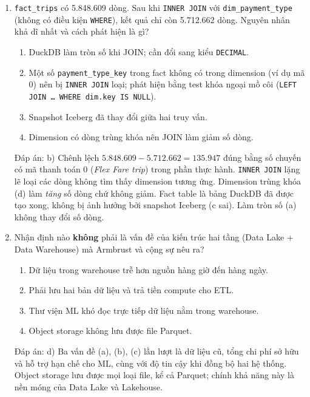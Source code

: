 \documentclass[12pt]{article}
\begin{document}
\begin{enumerate}[label=\textbf{\arabic*.}, leftmargin=1.6em, itemsep=1.2em]
\item \texttt{fact\_trips} có 5.848.609 dòng. Sau khi \texttt{INNER JOIN} với \texttt{dim\_payment\_type} (không có điều kiện \texttt{WHERE}), kết quả chỉ còn 5.712.662 dòng. Nguyên nhân khả dĩ nhất và cách phát hiện là gì?

\begin{enumerate}[label=\alph*), leftmargin=2.2em, itemsep=1pt]
    \item DuckDB làm tròn số khi JOIN; cần đổi sang kiểu \texttt{DECIMAL}.
    \item Một số \texttt{payment\_type\_key} trong fact không có trong dimension (ví dụ mã 0) nên bị \texttt{INNER JOIN} loại; phát hiện bằng test khóa ngoại mồ côi (\texttt{LEFT JOIN \dots{} WHERE dim.key IS NULL}).
    \item Snapshot Iceberg đã thay đổi giữa hai truy vấn.
    \item Dimension có dòng trùng khóa nên JOIN làm giảm số dòng.
\end{enumerate}
\begin{guidelinebox}{Đáp án: b)}
Chênh lệch $5.848.609 - 5.712.662 = 135.947$ đúng bằng số chuyến có mã thanh toán 0 (\textit{Flex Fare trip}) trong phần thực hành. \texttt{INNER JOIN} lặng lẽ loại các dòng không tìm thấy dimension tương ứng. Dimension trùng khóa (d) làm \emph{tăng} số dòng chứ không giảm. Fact table là bảng DuckDB đã được tạo xong, không bị ảnh hưởng bởi snapshot Iceberg (c sai). Làm tròn số (a) không thay đổi số dòng.
\end{guidelinebox}

\item Nhận định nào \textbf{không} phải là vấn đề của kiến trúc hai tầng (Data Lake + Data Warehouse) mà Armbrust và cộng sự nêu ra?

\begin{enumerate}[label=\alph*), leftmargin=2.2em, itemsep=1pt]
    \item Dữ liệu trong warehouse trễ hơn nguồn hàng giờ đến hàng ngày.
    \item Phải lưu hai bản dữ liệu và trả tiền compute cho ETL.
    \item Thư viện ML khó đọc trực tiếp dữ liệu nằm trong warehouse.
    \item Object storage không lưu được file Parquet.
\end{enumerate}
\begin{guidelinebox}{Đáp án: d)}
Ba vấn đề (a), (b), (c) lần lượt là dữ liệu cũ, tổng chi phí sở hữu và hỗ trợ hạn chế cho ML, cùng với độ tin cậy khi đồng bộ hai hệ thống. Object storage lưu được mọi loại file, kể cả Parquet; chính khả năng này là nền móng của Data Lake và Lakehouse.
\end{guidelinebox}

\end{enumerate}
\end{document}
